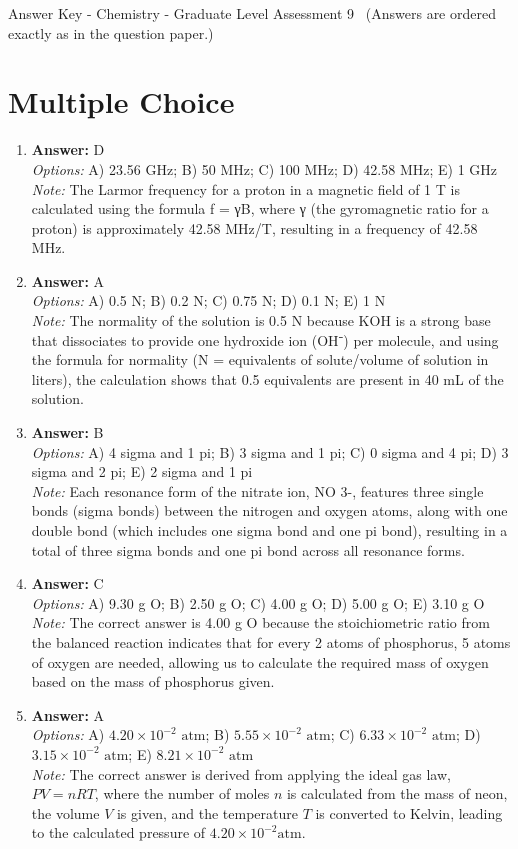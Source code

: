 \documentclass[12pt]{article}
\begin{document}
\begin{center}
Answer Key - Chemistry - Graduate Level Assessment 9 \
\small (Answers are ordered exactly as in the question paper.)
\end{center}

\section*{Multiple Choice}
\begin{enumerate}[label=\arabic*.]
\item \textbf{Answer:} D
\\ \textit{Options:} A) 23.56 GHz; B) 50 MHz; C) 100 MHz; D) 42.58 MHz; E) 1 GHz
\\ \textit{Note:} The Larmor frequency for a proton in a magnetic field of 1 T is calculated using the formula f = γB, where γ (the gyromagnetic ratio for a proton) is approximately 42.58 MHz/T, resulting in a frequency of 42.58 MHz.
\item \textbf{Answer:} A
\\ \textit{Options:} A) 0.5 N; B) 0.2 N; C) 0.75 N; D) 0.1 N; E) 1 N
\\ \textit{Note:} The normality of the solution is 0.5 N because KOH is a strong base that dissociates to provide one hydroxide ion (OH⁻) per molecule, and using the formula for normality (N = equivalents of solute/volume of solution in liters), the calculation shows that 0.5 equivalents are present in 40 mL of the solution.
\item \textbf{Answer:} B
\\ \textit{Options:} A) 4 sigma and 1 pi; B) 3 sigma and 1 pi; C) 0 sigma and 4 pi; D) 3 sigma and 2 pi; E) 2 sigma and 1 pi
\\ \textit{Note:} Each resonance form of the nitrate ion, NO 3-, features three single bonds (sigma bonds) between the nitrogen and oxygen atoms, along with one double bond (which includes one sigma bond and one pi bond), resulting in a total of three sigma bonds and one pi bond across all resonance forms.
\item \textbf{Answer:} C
\\ \textit{Options:} A) 9.30 g O; B) 2.50 g O; C) 4.00 g O; D) 5.00 g O; E) 3.10 g O
\\ \textit{Note:} The correct answer is 4.00 g O because the stoichiometric ratio from the balanced reaction indicates that for every 2 atoms of phosphorus, 5 atoms of oxygen are needed, allowing us to calculate the required mass of oxygen based on the mass of phosphorus given.
\item \textbf{Answer:} A
\\ \textit{Options:} A) $4.20 \times 10^{-2}$ $\text{atm}$; B) $5.55 \times 10^{-2}$ $\text{atm}$; C) $6.33 \times 10^{-2}$ $\text{atm}$; D) $3.15 \times 10^{-2}$ $\text{atm}$; E) $8.21 \times 10^{-2}$ $\text{atm}$
\\ \textit{Note:} The correct answer is derived from applying the ideal gas law, \( PV = nRT \), where the number of moles \( n \) is calculated from the mass of neon, the volume \( V \) is given, and the temperature \( T \) is converted to Kelvin, leading to the calculated pressure of \( 4.20 \times 10^{-2} \text{atm} \).
\end{enumerate}
\end{document}
